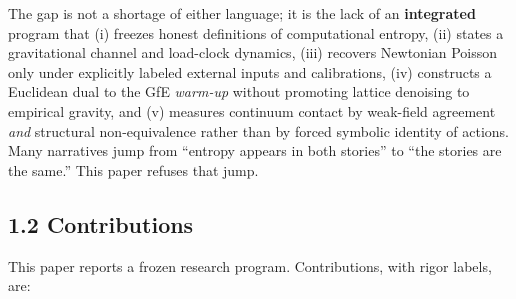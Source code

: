 \documentclass[
  11pt,
]{article}
\begin{document}
The gap is not a shortage of either language; it is the lack of an \textbf{integrated} program that (i) freezes honest definitions of computational entropy, (ii) states a gravitational channel and load-clock dynamics, (iii) recovers Newtonian Poisson only under explicitly labeled external inputs and calibrations, (iv) constructs a Euclidean dual to the GfE \emph{warm-up} without promoting lattice denoising to empirical gravity, and (v) measures continuum contact by weak-field agreement \emph{and} structural non-equivalence rather than by forced symbolic identity of actions. Many narratives jump from ``entropy appears in both stories'' to ``the stories are the same.'' This paper refuses that jump.

\subsection{1.2 Contributions}\label{contributions}

This paper reports a frozen research program. Contributions, with rigor labels, are:
\end{document}
